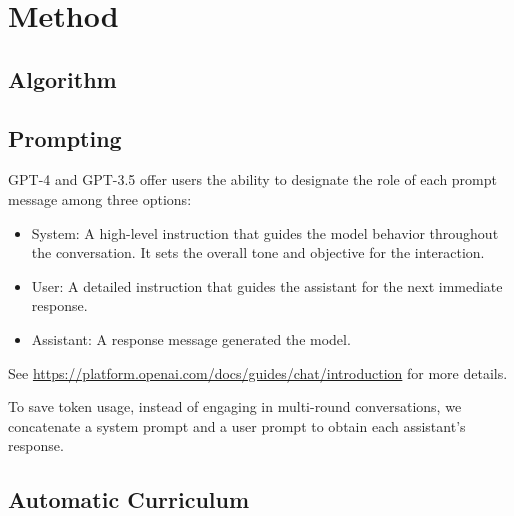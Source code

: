 \section{Method}
\label{supp:sec:method}

\subsection{\voyager Algorithm}
\renewcommand\lstlistingname{Pseudocode}


\subsection{Prompting}
GPT-4 and GPT-3.5 offer users the ability to designate the role of each prompt message among three options:
\begin{itemize}
    \item System: A high-level instruction that guides the model behavior throughout the conversation. It sets the overall tone and objective for the interaction.
    \item User: A detailed instruction that guides the assistant for the next immediate response.
    \item Assistant: A response message generated the model.
\end{itemize}
See \url{https://platform.openai.com/docs/guides/chat/introduction} for more details.

To save token usage, instead of engaging in multi-round conversations, we concatenate a system prompt and a user prompt to obtain each assistant's response.

\renewcommand\lstlistingname{Prompt}
\setcounter{lstlisting}{0}
\subsection{Automatic Curriculum}
\label{supp:sec:curriculum}
